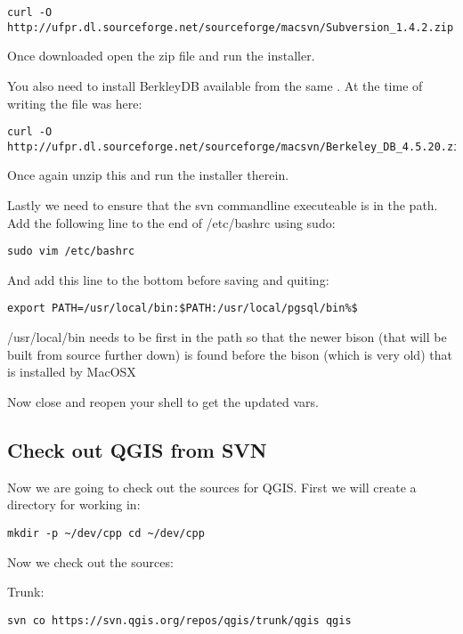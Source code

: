 \begin{verbatim}
curl -O http://ufpr.dl.sourceforge.net/sourceforge/macsvn/Subversion_1.4.2.zip 
\end{verbatim}

Once downloaded open the zip file and run the installer.

You also need to install BerkleyDB available from the same
. At the time of writing the
file was here:

\begin{verbatim}
curl -O http://ufpr.dl.sourceforge.net/sourceforge/macsvn/Berkeley_DB_4.5.20.zip 
\end{verbatim}

Once again unzip this and run the installer therein.

Lastly we need to ensure that the svn commandline executeable is in the path.
Add the following line to the end of /etc/bashrc using sudo:

\begin{verbatim}
sudo vim /etc/bashrc 
\end{verbatim}

And add this line to the bottom before saving and quiting:

\begin{verbatim}
export PATH=/usr/local/bin:$PATH:/usr/local/pgsql/bin%$ 
\end{verbatim}

/usr/local/bin needs to be first in the path so that the newer bison (that will
be built from source further down) is found before the bison (which is very
old) that is installed by MacOSX

Now close and reopen your shell to get the updated vars.

\subsection{Check out QGIS from SVN}
Now we are going to check out the sources for QGIS. First we will create a
directory for working in:

\begin{verbatim}
mkdir -p ~/dev/cpp cd ~/dev/cpp 
\end{verbatim}

Now we check out the sources:

Trunk:

\begin{verbatim}
svn co https://svn.qgis.org/repos/qgis/trunk/qgis qgis 
\end{verbatim}

